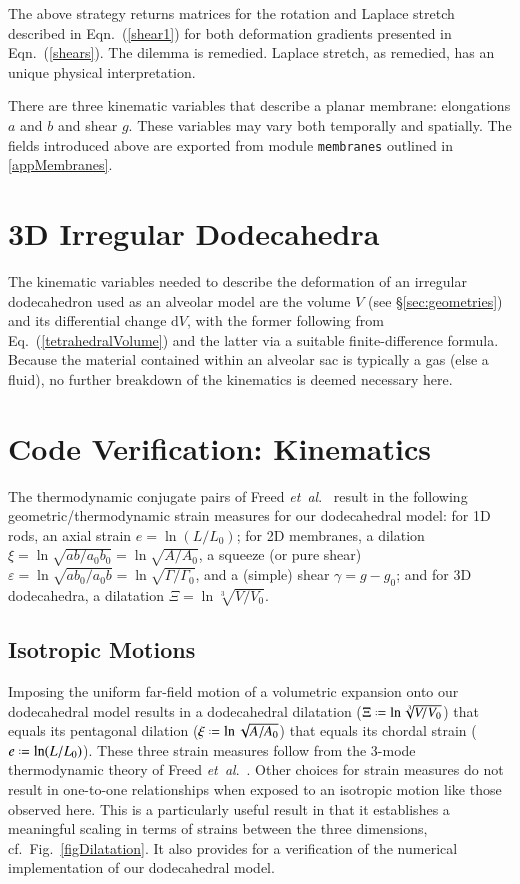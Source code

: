 The above strategy returns matrices for the rotation and Laplace stretch described in Eqn.~(\ref{shear1}) for both deformation gradients presented in Eqn.~(\ref{shears}). The dilemma is remedied.  Laplace stretch, as remedied, has an unique physical interpretation.

There are three kinematic variables that describe a planar membrane: elongations $a$ and $b$ and shear $g$.  These variables may vary both temporally and spatially.  The fields introduced above are exported from module \texttt{membranes} outlined in \ref{appMembranes}.

\section{3D Irregular Dodecahedra}

The kinematic variables needed to describe the deformation of an irregular dodecahedron used as an alveolar model are the volume $V$ (see \S\ref{sec:geometries}) and its differential change $\mathrm{d}V$, with the former following from Eq.~(\ref{tetrahedralVolume}) and the latter via a suitable finite-difference formula.  Because the material contained within an alveolar sac is typically a gas (else a fluid), no further breakdown of the kinematics is deemed necessary here.

\section{Code Verification: Kinematics}
\label{sec:verification}

The thermodynamic conjugate pairs of Freed \textit{et~al}.\ \cite{Freed17,Freedetal17,FreedZamani19} result in the following geometric/thermo\-dynamic strain measures for our dodecahedral model: for 1D rods, an axial strain $e = \ln ( L / L_0 )$; for 2D membranes, a dilation $\xi = \ln \sqrt{ab/a_0b_0} = \ln \sqrt{A/A_0}$, a squeeze (or pure shear) $\varepsilon = \ln \sqrt{ab_0/a_0b} = \ln \sqrt{\Gamma / \Gamma_0}$, and a (simple) shear $\gamma = g - g_0$; and for 3D dodecahedra, a dilatation $\Xi = \ln \sqrt[3]{V \! / V_0}$. 

\subsection{Isotropic Motions}

Imposing the uniform far-field motion of a volumetric expansion onto our dodecahedral model results in a dodecahedral dilatation ($\Xi \defeq \ln \sqrt[3]{ V \! / V_0 }$) that equals its pentagonal dilation ($\xi \defeq \ln \sqrt{ A / A_0 }$) that equals its chordal strain ($e \defeq \ln ( L / L_0 )$).  These three strain measures follow from the 3-mode thermo\-dynamic theory of Freed \textit{et~al}.\ \cite{Freedetal17,FreedZamani19}.  Other choices for strain measures do not result in one-to-one relationships when exposed to an isotropic motion like those observed here.  This is a particularly useful result in that it establishes a meaningful scaling in terms of strains between the three dimensions, cf.\ Fig.~\ref{figDilatation}.  It also provides for a verification of the numerical implementation of our dodecahedral model.  

